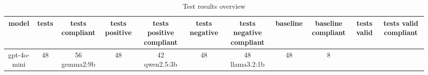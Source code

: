 
  \begin{table}[h!]
  \centering
  \begin{tabular}{|c|c|c|c|c|c|c|c|c|c|c|}
  \hline
  model & tests & tests compliant & tests positive & tests positive compliant & tests negative & tests negative compliant & baseline & baseline compliant & tests valid & tests valid compliant \\
  \hline
  gpt-4o-mini & 48 & 56%
\hline
gemma2:9b & 48 & 42%
\hline
qwen2.5:3b & 48 & 48%
\hline
llama3.2:1b & 48 & 8%
  \end{tabular}
  \caption{Test results overview}
  
  \end{table}
  